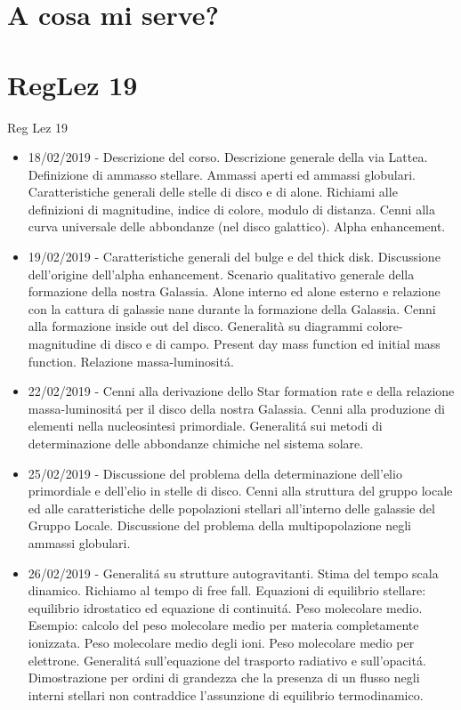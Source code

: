 \section{A cosa mi serve?}

\section{RegLez 19}
\begin{frame}[allowframebreaks]{Reg Lez 19}
\begin{itemize}
\item 18/02/2019 - Descrizione del corso. Descrizione generale della via Lattea. Definizione di ammasso stellare. Ammassi aperti ed ammassi globulari. Caratteristiche generali delle stelle di disco e di alone. Richiami alle definizioni di magnitudine, indice di colore, modulo di distanza. Cenni alla curva universale delle abbondanze (nel disco galattico). Alpha enhancement.  
\item 19/02/2019 - Caratteristiche generali del bulge e del thick disk. Discussione dell'origine dell'alpha enhancement. Scenario qualitativo generale della formazione della nostra Galassia. Alone interno ed alone esterno e relazione con la cattura di galassie nane durante la formazione della Galassia. Cenni alla formazione inside out del disco. Generalità su diagrammi colore- magnitudine di disco e di campo. Present day mass function ed initial mass function. Relazione massa-luminosit\'a. 
\item 22/02/2019 - Cenni alla derivazione dello Star formation rate e della relazione massa-luminosit\'a per il disco della nostra Galassia. Cenni alla produzione di elementi nella nucleosintesi primordiale. Generalit\'a sui metodi di determinazione delle abbondanze chimiche nel sistema solare. 
\item 25/02/2019 - Discussione del problema della determinazione dell'elio primordiale e dell'elio in stelle di disco. Cenni alla struttura del gruppo locale ed alle caratteristiche delle popolazioni stellari all'interno delle galassie del Gruppo Locale. Discussione del problema della multipopolazione negli ammassi globulari. 
\item 26/02/2019 - Generalit\'a su strutture autogravitanti. Stima del tempo scala dinamico. Richiamo al tempo di free fall. Equazioni di equilibrio stellare: equilibrio idrostatico ed equazione di continuit\'a. Peso molecolare medio. Esempio: calcolo del peso molecolare medio per materia completamente ionizzata. Peso molecolare medio degli ioni. Peso molecolare medio per elettrone. Generalit\'a sull'equazione del trasporto radiativo e sull'opacit\'a. Dimostrazione per ordini di grandezza che la presenza di un flusso negli interni stellari non contraddice l'assunzione di equilibrio termodinamico. 

\end{itemize}
\end{frame}
